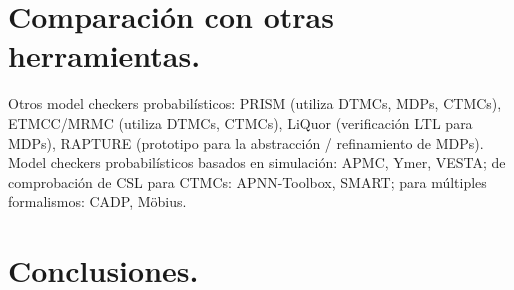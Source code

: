 \documentclass[11pt]{article}
\begin{document}







\section{Comparaci\'on con otras herramientas.}

Otros model checkers probabil\'isticos: PRISM (utiliza DTMCs, MDPs, CTMCs), ETMCC/MRMC (utiliza DTMCs, CTMCs), LiQuor (verificaci\'on LTL para MDPs), RAPTURE (prototipo para la abstracci\'on / refinamiento de MDPs). Model checkers probabil\'isticos basados en simulaci\'on: APMC, Ymer, VESTA; de comprobaci\'on de CSL para CTMCs: APNN-Toolbox, SMART; para m\'ultiples formalismos: CADP, M\"{o}bius.

\section{Conclusiones.}
\end{document}
